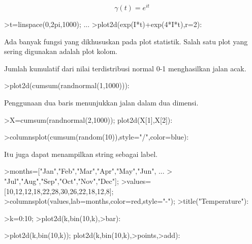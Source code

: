 \documentclass[a4paper,10pt]{article}
\begin{document}
\begin{eulernotebook}
\begin{eulercomment}
\begin{eulercomment}
\begin{eulercomment}
\begin{eulercomment}
\begin{eulercomment}
\begin{eulercomment}
\begin{eulercomment}
\begin{eulercomment}
\begin{eulercomment}
\end{eulercomment}
\begin{eulerformula}
\[
\gamma(t) = e^{it}
\]
\end{eulerformula}
\begin{eulerprompt}
>t=linspace(0,2pi,1000); ...
>plot2d(exp(I*t)+exp(4*I*t),r=2):
\end{eulerprompt}
\begin{eulercomment}
Ada banyak fungsi yang dikhususkan pada plot statistik. Salah satu
plot yang sering digunakan adalah plot kolom.

Jumlah kumulatif dari nilai terdistribusi normal 0-1 menghasilkan
jalan acak.
\end{eulercomment}
\begin{eulerprompt}
>plot2d(cumsum(randnormal(1,1000))):
\end{eulerprompt}
\begin{eulercomment}
Penggunaan dua baris menunjukkan jalan dalam dua dimensi.
\end{eulercomment}
\begin{eulerprompt}
>X=cumsum(randnormal(2,1000)); plot2d(X[1],X[2]):
\end{eulerprompt}
\begin{eulerprompt}
>columnsplot(cumsum(random(10)),style="/",color=blue):
\end{eulerprompt}
\begin{eulercomment}
Itu juga dapat menampilkan string sebagai label.
\end{eulercomment}
\begin{eulerprompt}
>months=["Jan","Feb","Mar","Apr","May","Jun", ...
>  "Jul","Aug","Sep","Oct","Nov","Dec"];
>values=[10,12,12,18,22,28,30,26,22,18,12,8];
>columnsplot(values,lab=months,color=red,style="-");
>title("Temperature"):
\end{eulerprompt}
\begin{eulerprompt}
>k=0:10;
>plot2d(k,bin(10,k),>bar):
\end{eulerprompt}
\begin{eulerprompt}
>plot2d(k,bin(10,k)); plot2d(k,bin(10,k),>points,>add):

\end{eulerprompt}
\end{eulercomment}
\end{eulercomment}
\end{eulercomment}
\end{eulercomment}
\end{eulercomment}
\end{eulercomment}
\end{eulercomment}
\end{eulercomment}
\end{eulernotebook}
\end{document}
